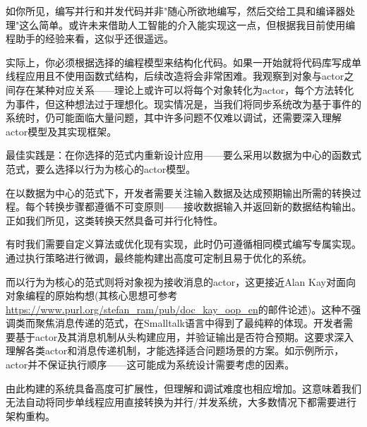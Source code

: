 如你所见，编写并行和并发代码并非"随心所欲地编写，然后交给工具和编译器处理"这么简单。或许未来借助人工智能的介入能实现这一点，但根据我目前使用编程助手的经验来看，这似乎还很遥远。

实际上，你必须根据选择的编程模型来结构化代码。如果一开始就将代码库写成单线程应用且不使用函数式结构，后续改造将会非常困难。我观察到对象与actor之间存在某种对应关系——理论上或许可以将每个对象转化为actor，每个方法转化为事件，但这种想法过于理想化。现实情况是，当我们将同步系统改为基于事件的系统时，仍可能面临大量问题，其中许多问题不仅难以调试，还需要深入理解actor模型及其实现框架。

最佳实践是：在你选择的范式内重新设计应用——要么采用以数据为中心的函数式范式，要么选择以行为为核心的actor模型。

在以数据为中心的范式下，开发者需要关注输入数据及达成预期输出所需的转换过程。每个转换步骤都遵循不可变原则——接收数据输入并返回新的数据结构输出。正如我们所见，这类转换天然具备可并行化特性。

有时我们需要自定义算法或优化现有实现，此时仍可遵循相同模式编写专属实现。通过执行策略进行微调，最终能构建出高度可定制且易于优化的系统。

而以行为为核心的范式则将对象视为接收消息的actor，这更接近Alan Kay对面向对象编程的原始构想(其核心思想可参考\url{https://www.purl.org/stefan_ram/pub/doc_kay_oop_en}的邮件论述)。这种不强调类而聚焦消息传递的范式，在Smalltalk语言中得到了最纯粹的体现。开发者需要基于actor及其消息机制从头构建应用，并验证输出是否符合预期。这要求深入理解各类actor和消息传递机制，才能选择适合问题场景的方案。如示例所示，actor并不保证执行顺序——这可能成为系统设计需要考虑的因素。

由此构建的系统具备高度可扩展性，但理解和调试难度也相应增加。这意味着我们无法自动将同步单线程应用直接转换为并行/并发系统，大多数情况下都需要进行架构重构。